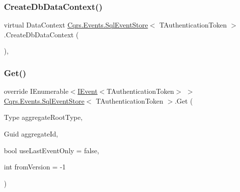 \mbox{\label{classCqrs_1_1Events_1_1SqlEventStore_a47a3fb01f9ccc65ec52ad96236cea3fb}} 
\subsubsection{\texorpdfstring{Create\+Db\+Data\+Context()}{CreateDbDataContext()}}
{\footnotesize\ttfamily virtual Data\+Context \hyperlink{classCqrs_1_1Events_1_1SqlEventStore}{Cqrs.\+Events.\+Sql\+Event\+Store}$<$ T\+Authentication\+Token $>$.Create\+Db\+Data\+Context (\begin{DoxyParamCaption}{ }\end{DoxyParamCaption})\hspace{0.3cm}{\ttfamily [protected]}, {\ttfamily [virtual]}}

\mbox{\label{classCqrs_1_1Events_1_1SqlEventStore_a7e32a08a015642a5bc1cefa6998e6f11}} 
\subsubsection{\texorpdfstring{Get()}{Get()}\hspace{0.1cm}{\footnotesize\ttfamily [1/2]}}
{\footnotesize\ttfamily override I\+Enumerable$<$\hyperlink{interfaceCqrs_1_1Events_1_1IEvent}{I\+Event}$<$T\+Authentication\+Token$>$ $>$ \hyperlink{classCqrs_1_1Events_1_1SqlEventStore}{Cqrs.\+Events.\+Sql\+Event\+Store}$<$ T\+Authentication\+Token $>$.Get (\begin{DoxyParamCaption}\item[{Type}]{aggregate\+Root\+Type,  }\item[{Guid}]{aggregate\+Id,  }\item[{bool}]{use\+Last\+Event\+Only = {\ttfamily false},  }\item[{int}]{from\+Version = {\ttfamily -\/1} }\end{DoxyParamCaption})\hspace{0.3cm}{\ttfamily [virtual]}}



